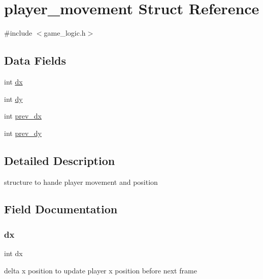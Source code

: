 \hypertarget{structplayer__movement}{}\section{player\+\_\+movement Struct Reference}
\label{structplayer__movement}


{\ttfamily \#include $<$game\+\_\+logic.\+h$>$}

\subsection*{Data Fields}
\begin{DoxyCompactItemize}
\item 
int \mbox{\hyperlink{structplayer__movement_a6a0d40b2ed6d9e674f93396212f0028f}{dx}}
\item 
int \mbox{\hyperlink{structplayer__movement_a4817151aee120cc100c400d3076f4b93}{dy}}
\item 
int \mbox{\hyperlink{structplayer__movement_a73691226e0004c9c476b99fb3a03a1e2}{prev\+\_\+dx}}
\item 
int \mbox{\hyperlink{structplayer__movement_a3842d3ad7383cb6c7e19fd2178a85820}{prev\+\_\+dy}}
\end{DoxyCompactItemize}


\subsection{Detailed Description}
structure to hande player movement and position 

\subsection{Field Documentation}
\mbox{\label{structplayer__movement_a6a0d40b2ed6d9e674f93396212f0028f}} 
\subsubsection{\texorpdfstring{dx}{dx}}
{\footnotesize\ttfamily int dx}

delta x position to update player x position before next frame \mbox{\label{structplayer__movement_a4817151aee120cc100c400d3076f4b93}} 

